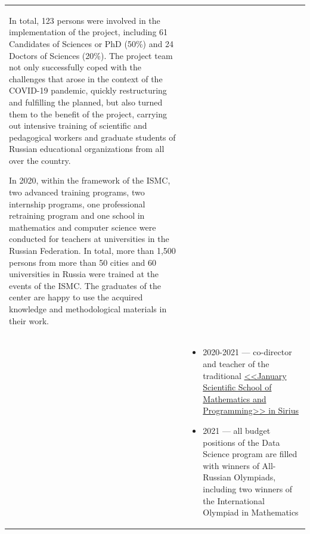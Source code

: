 \documentclass[11pt]{article}
\begin{document}
\begin{longtable} {l | p{}}
\begin{itemize}
  In total, 123 persons were involved in the implementation of the project, including 61 Candidates of Sciences or PhD (50\%) and 24 Doctors of Sciences (20\%). The project team not only successfully coped with the challenges that arose in the context of the COVID-19 pandemic, quickly restructuring and fulfilling the planned, but also turned them to the benefit of the project, carrying out intensive training of scientific and pedagogical workers and graduate students of Russian educational organizations from all over the country.

  In 2020, within the framework of the ISMC, two advanced training programs,
  two internship programs, one professional retraining program and one school
  in mathematics and computer science were conducted for teachers at universities
  in the Russian Federation. In total, more than 1,500 persons from more than
  50 cities and 60 universities in Russia were trained at the events of the ISMC.
  The graduates of the center are happy to use the acquired knowledge
  and methodological materials in their work.
\end{itemize} \\
&
\begin{itemize}
	\item 2020-2021 — co-director and teacher of the traditional \href{https://sochisirius.ru/obuchenie/nauka/smena747/3603}{<<January Scientific School of Mathematics and Programming>> in Sirius}

	\item 2021 — all budget positions of the Data Science program are filled with winners of All-Russian Olympiads, including two winners of the International Olympiad in Mathematics
	

\end{itemize}
\end{longtable}
\end{document}
